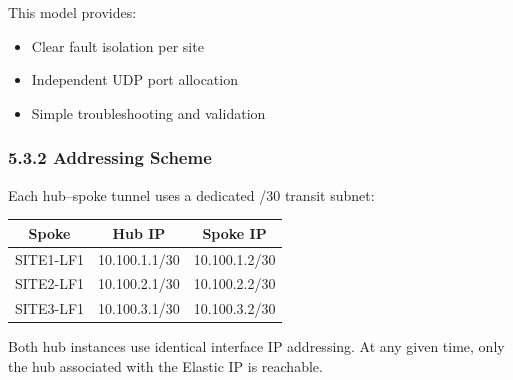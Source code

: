\documentclass[11pt]{article}
\begin{document}
This model provides:

\begin{itemize}
  \item Clear fault isolation per site
  \item Independent UDP port allocation
  \item Simple troubleshooting and validation
\end{itemize}

\subsubsection{5.3.2 Addressing Scheme}
\label{sec:wg-addressing}

Each hub--spoke tunnel uses a dedicated /30 transit subnet:

%
%
\begin{center}
\begin{tabular}{|c|c|c|}
\hline
\textbf{Spoke} & \textbf{Hub IP} & \textbf{Spoke IP} \\
\hline
SITE1-LF1 & 10.100.1.1/30 & 10.100.1.2/30 \\
SITE2-LF1 & 10.100.2.1/30 & 10.100.2.2/30 \\
SITE3-LF1 & 10.100.3.1/30 & 10.100.3.2/30 \\
\hline
\end{tabular}
\end{center}

Both hub instances use identical interface IP addressing. At any given time, only the hub associated with the Elastic IP is reachable.

%
%
\end{document}
